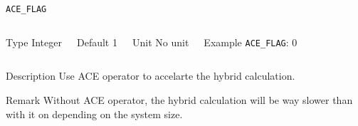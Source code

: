 \begin{frame}[allowframebreaks]{\texttt{ACE\_FLAG}} \label{ACE_FLAG}
\vspace*{-12pt}
\begin{columns}
\begin{block}{Type}
Integer
\end{block}

\begin{block}{Default}
1
\end{block}

\begin{block}{Unit}
No unit
\end{block}

\begin{block}{Example}
\texttt{ACE\_FLAG}: 0
\end{block}
\end{columns}

\begin{block}{Description}
Use ACE operator to accelarte the hybrid calculation.
\end{block}

\begin{block}{Remark}
Without ACE operator, the hybrid calculation will be way slower than with it on depending on the system size.
\end{block}

\end{frame}


